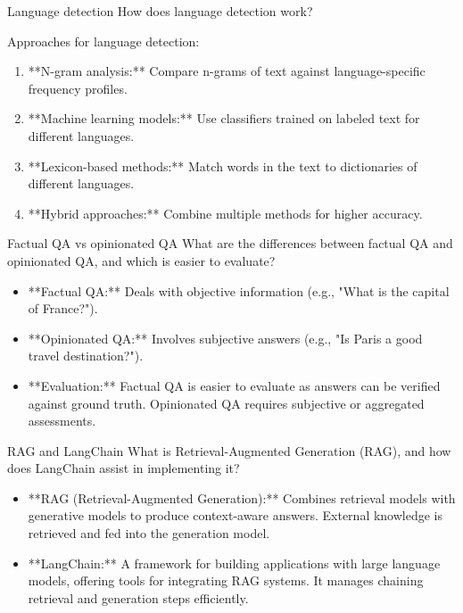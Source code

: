 \documentclass{article}
\begin{document}
\begin{exercise}{Language detection}
  How does language detection work?

  \begin{solution}
    Approaches for language detection:
    \begin{enumerate}
        \item **N-gram analysis:** Compare n-grams of text against language-specific frequency profiles.
        \item **Machine learning models:** Use classifiers trained on labeled text for different languages.
        \item **Lexicon-based methods:** Match words in the text to dictionaries of different languages.
        \item **Hybrid approaches:** Combine multiple methods for higher accuracy.
    \end{enumerate}
  \end{solution}
\end{exercise}

\begin{exercise}{Factual QA vs opinionated QA}
  What are the differences between factual QA and opinionated QA, and which is easier to evaluate?

  \begin{solution}
    \begin{itemize}
        \item **Factual QA:** Deals with objective information (e.g., "What is the capital of France?").
        \item **Opinionated QA:** Involves subjective answers (e.g., "Is Paris a good travel destination?").
        \item **Evaluation:** Factual QA is easier to evaluate as answers can be verified against ground truth. Opinionated QA requires subjective or aggregated assessments.
    \end{itemize}
  \end{solution}
\end{exercise}

\begin{exercise}{RAG and LangChain}
  What is Retrieval-Augmented Generation (RAG), and how does LangChain assist in implementing it?

  \begin{solution}
    \begin{itemize}
        \item **RAG (Retrieval-Augmented Generation):** Combines retrieval models with generative models to produce context-aware answers. External knowledge is retrieved and fed into the generation model.
        \item **LangChain:** A framework for building applications with large language models, offering tools for integrating RAG systems. It manages chaining retrieval and generation steps efficiently.
    \end{itemize}
  \end{solution}
\end{exercise}
\end{document}
